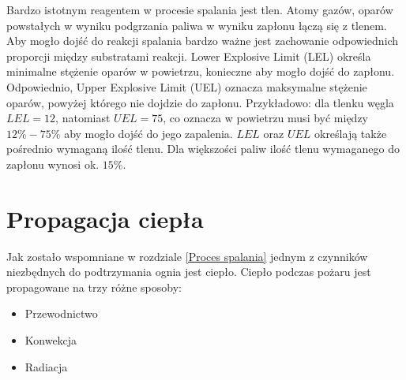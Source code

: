 Bardzo istotnym reagentem w procesie spalania jest tlen. Atomy gazów, oparów powstałych w wyniku podgrzania paliwa w wyniku zapłonu łączą się z tlenem.
Aby mogło dojść do reakcji spalania bardzo ważne jest zachowanie odpowiednich proporcji między substratami reakcji. Lower Explosive Limit (LEL) określa 
minimalne stężenie oparów w powietrzu, konieczne aby mogło dojść do zapłonu. Odpowiednio, Upper Explosive Limit (UEL) oznacza maksymalne stężenie oparów, powyżej
którego nie dojdzie do zapłonu. Przykładowo: dla tlenku węgla $LEL=12$, natomiast  $UEL=75$, co oznacza w powietrzu musi być między $12\%-75\%$ aby mogło dojść
do jego zapalenia. $LEL$ oraz $UEL$ określają także pośrednio wymaganą ilość tlenu. Dla większości paliw ilość tlenu wymaganego do zapłonu wynosi ok. $15\%$. 

\section {Propagacja ciepła}
Jak zostało wspomniane w rozdziale \ref{Proces spalania} jednym z czynników niezbędnych
do podtrzymania ognia jest ciepło. Ciepło podczas pożaru jest propagowane na trzy różne sposoby:
\begin {itemize}
\item Przewodnictwo
\item Konwekcja
\item Radiacja
\end {itemize}

